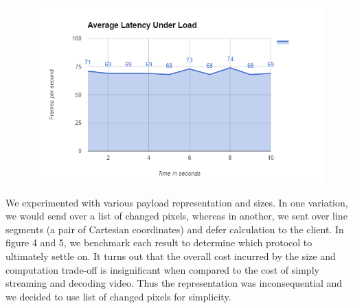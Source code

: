 \documentclass[conference]{IEEEtran}
\begin{document}
    \begin{figure}[H]
      \centering
      \includegraphics[width=\linewidth]{figure2b.PNG}
      \caption{}
      \label{fig:my_label}
    \end{figure}

    We experimented with various payload representation and sizes. In one variation, we would send over a list of changed pixels, whereas in another, we sent over line segments (a pair of Cartesian coordinates) and defer calculation to the client. In figure 4 and 5, we benchmark each result to determine which protocol to ultimately settle on. It turns out that the overall cost incurred by the size and computation trade-off is insignificant when compared to the cost of simply streaming and decoding video. Thus the representation was inconsequential and we decided to use list of changed pixels for simplicity.
\end{document}
